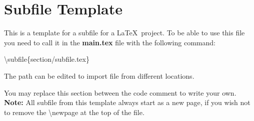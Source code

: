 \documentclass[../main.tex]{subfiles}
\begin{document}
\newpage


\section{Subfile Template}

This is a template for a subfile for a \LaTeX\ project.
To be able to use this file you need to call it in the \textbf{main.tex} file with the following command:

\begin{center}
	\textbackslash subfile\{section/subfile.tex\}
\end{center}

The path can be edited to import file from different locations.

You may replace this section between the code comment to write your own.\\

\textbf{Note:} All subfile from this template always start as a new page, if you wish not to remove the \textbackslash newpage at the top of the file.

	
	
\end{document}

